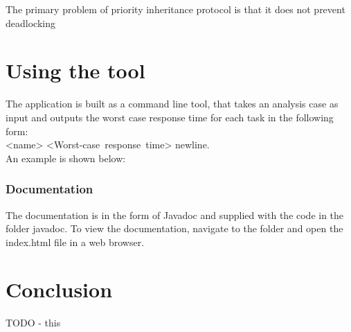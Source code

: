 \documentclass{acm_proc_article-sp}
\begin{document}
The primary problem of priority inheritance protocol is that it does not prevent deadlocking

\section{Using the tool}
The application is built as a command line tool, that takes an analysis case as input and outputs the worst case response time for each task in the following form:\\ <name> <Worst-case~response~time> newline.\\ An example is shown below:


\subsubsection{Documentation}
The documentation is in the form of Javadoc and supplied with the code in the folder javadoc. To view the documentation, navigate to the folder and open the index.html file in a web browser.

\section{Conclusion}
\label{sec:conclusion}
%
TODO - this

%






%
%


\end{document}
